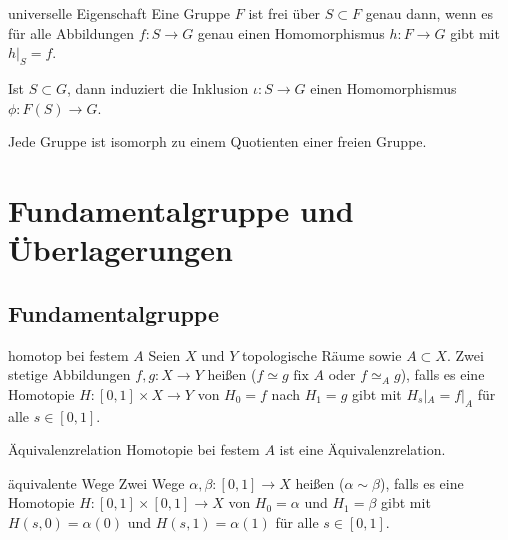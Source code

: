 \linie

\begin{Satz}{universelle Eigenschaft}
    Eine Gruppe $F$ ist frei über $S \subset F$ genau dann, wenn es für alle
    Abbildungen $f\colon S \rightarrow G$ genau einen Homomorphismus
    $h\colon F \rightarrow G$ gibt mit $h|_S = f$.
\end{Satz}

\begin{Kor}
    Ist $S \subset G$, dann induziert die Inklusion
    $\iota\colon S \rightarrow G$ einen Homomorphismus
    $\phi\colon F(S) \rightarrow G$.
\end{Kor}

\begin{Kor}
    Jede Gruppe ist isomorph zu einem Quotienten einer freien Gruppe.
\end{Kor}

\pagebreak

\section{%
    Fundamentalgruppe und Überlagerungen%
}

\subsection{%
    Fundamentalgruppe%
}

\begin{Def}{homotop bei festem $A$}
    Seien $X$ und $Y$ topologische Räume sowie $A \subset X$.
    Zwei stetige Abbildungen $f, g\colon X \rightarrow Y$ heißen
     ($f \simeq g \text{ fix } A$ oder
    $f \simeq_A g$), falls es eine Homotopie
    $H\colon [0, 1] \times X \rightarrow Y$ von $H_0 = f$ nach $H_1 = g$ gibt
    mit $H_s|_A = f|_A$ für alle $s \in [0, 1]$.
\end{Def}

\begin{Lemma}{Äquivalenzrelation}
    Homotopie bei festem $A$ ist eine Äquivalenzrelation.
\end{Lemma}

\linie

\begin{Def}{äquivalente Wege}
    Zwei Wege $\alpha, \beta\colon [0, 1] \rightarrow X$ heißen
     ($\alpha \sim \beta$), falls es eine Homotopie
    $H\colon [0, 1] \times [0, 1] \rightarrow X$ von $H_0 = \alpha$ und
    $H_1 = \beta$ gibt mit $H(s, 0) = \alpha(0)$ und $H(s, 1) = \alpha(1)$
    für alle $s \in [0, 1]$.
\end{Def}

